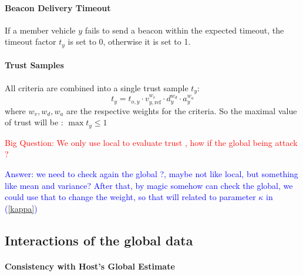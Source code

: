 \documentclass[letterpaper, 10pt, conference]{ieeeconf}  %
\def\eqref#1{(\ref{#1})}
\begin{document}
\paragraph{Beacon Delivery Timeout} If a member vehicle $y$ fails to send a beacon within the expected timeout, the timeout factor $t_y$ is set to 0, otherwise it is set to 1.

\paragraph{Trust Samples}

All criteria are combined into a single trust sample $t_y$:
\begin{equation}
    t_y = t_{o,y} \cdot v^{w_v}_{y,\text{ref}} \cdot d^{w_d}_y \cdot a^{w_a}_y 
\end{equation}
where $w_v, w_d, w_a$ are the respective weights for the criteria. So the maximal value of trust will be : 
$\max{t_y} \leq 1$


\textcolor{red}{Big Question: We only use local to evaluate trust , how if the global being attack ? }

\textcolor{blue}{Answer: we need to check again the global ?, maybe not like local, but something like mean and variance? After that, by magic somehow can check the global, we could use that to change the weight, so that will related to parameter $\kappa$ in \eqref{kappa} }


\subsection{Interactions of the global data}


\paragraph{Consistency with Host's Global Estimate}
\end{document}

